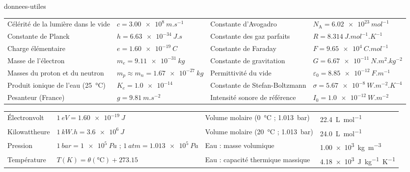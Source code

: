 
\begin{blocEdition}{donnees-utiles}
\fontsize{10}{13.5}\selectfont
{}
{\small\begin{tabularx}{\linewidth}{@{}Yl|Yl@{}}\toprule
Célérité de la lumière dans le vide & $c=\qty{3,00e8}{m.s^{-1}}$ & Constante d'Avogadro & $N_\mathrm{A}=\qty{6,02e23}{mol^{-1}}$ \\
Constante de Planck & $h=\qty{6,63e-34}{J.s}$ & Constante des gaz parfaits & $R=\qty{8,314}{J.mol^{-1}.K^{-1}}$ \\
Charge élémentaire & $e=\qty{1,60e-19}{C}$ & Constante de Faraday & $F=\qty{9,65e4}{C.mol^{-1}}$ \\
Masse de l'électron & $m_e=\qty{9,11e-31}{kg}$ & Constante de gravitation & $G=\qty{6,67e-11}{N.m^2.kg^{-2}}$ \\
Masses du proton et du neutron & $m_p\approx m_n=\qty{1,67e-27}{kg}$ & Permittivité du vide & $\varepsilon_0=\qty{8,85e-12}{F.m^{-1}}$ \\
Produit ionique de l'eau (\qty{25}{\degreeCelsius}) & $K_e=\num{1.0e-14}$ & Constante de Stefan-Boltzmann & $\sigma=\qty{5,67e-8}{W.m^{-2}.K^{-4}}$ \\
Pesanteur (France) & $g=\qty{9,81}{m.s^{-2}}$ & Intensité sonore de référence & $I_0=\qty{1,0e-12}{W.m^{-2}}$ \\\bottomrule
\end{tabularx}}
{\small\begin{tabularx}{\linewidth}{@{}Yl|Yl@{}}\toprule
Électronvolt & $\qty{1}{eV}=\qty{1,60e-19}{J}$ & Volume molaire (\qty{0}{\degreeCelsius} ; \qty{1,013}{bar}) & \qty{22,4}{L.mol^{-1}} \\
Kilowattheure & $\qty{1}{kW.h}=\qty{3,6e6}{J}$ & Volume molaire (\qty{20}{\degreeCelsius} ; \qty{1,013}{bar}) & \qty{24,0}{L.mol^{-1}} \\
Pression & $\qty{1}{bar}=\qty{1e5}{Pa}$ ; $\qty{1}{atm}=\qty{1,013e5}{Pa}$ & Eau : masse volumique & \qty{1,00e3}{kg.m^{-3}} \\
Température & $T(\unit{K})=\theta(\unit{\degreeCelsius})+\num{273,15}$ & Eau : capacité thermique massique & \qty{4,18e3}{J.kg^{-1}.K^{-1}} \\

\end{tabularx}}
\end{blocEdition}
